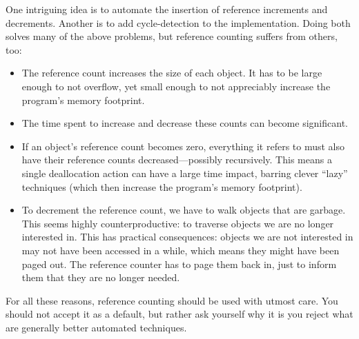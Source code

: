 One intriguing idea is to automate the insertion of reference increments and
decrements. Another is to add cycle-detection to the implementation. Doing both
solves many of the above problems, but reference counting suffers from others,
too:
\begin{itemize}
  \item 
The reference count increases the size of each object. It has to be large enough
to not overflow, yet small enough to not appreciably increase the program’s
memory footprint.
  \item 
The time spent to increase and decrease these counts can become significant.
  \item 
If an object’s reference count becomes zero, everything it refers to must also
have their reference counts decreased—possibly recursively. This means a single
deallocation action can have a large time impact, barring clever “lazy”
techniques (which then increase the program’s memory footprint).
  \item 
To decrement the reference count, we have to walk objects that are garbage. This
seems highly counterproductive: to traverse objects we are no longer interested
in. This has practical consequences: objects we are not interested in may not
have been accessed in a while, which means they might have been paged out.
The reference counter has to page them back in, just to inform them that they
are no longer needed.
\end{itemize}

For all these reasons, reference counting should be used with utmost care. You
should not accept it as a default, but rather ask yourself why it is you reject
what are generally better automated techniques.

